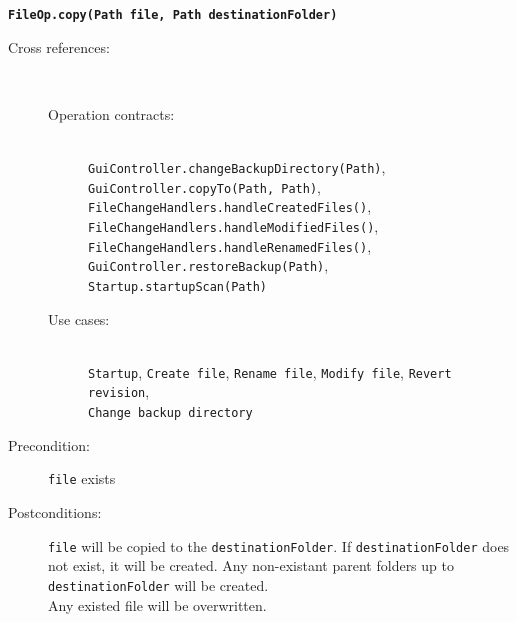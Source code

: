 \documentclass[12pt,a4paper]{article}
\begin{document}
\vspace{0.75cm}

\textbf{\texttt{FileOp.copy(Path file, Path destinationFolder)}}
\begin{description}
	\item[Cross references:] \hfill \vspace{-4ex}  \\
		\begin{description} 
		\item[Operation contracts:] \hfill \\
			\texttt{GuiController.changeBackupDirectory(Path)},\\
			\texttt{GuiController.copyTo(Path, Path)},\\
			\texttt{FileChangeHandlers.handleCreatedFiles()}, \\
			\texttt{FileChangeHandlers.handleModifiedFiles()}, \\
			\texttt{FileChangeHandlers.handleRenamedFiles()},\\
			\texttt{GuiController.restoreBackup(Path)},\\
			\texttt{Startup.startupScan(Path)}
		\item[Use cases:] \hfill \\
			\texttt{Startup}, \texttt{Create file}, \texttt{Rename file},
			\texttt{Modify file}, \texttt{Revert revision},\\
			\texttt{Change backup directory}
	\end{description} 	      
	\item[Precondition:] \texttt{file} exists
	\item[Postconditions:] \texttt{file} will be copied to the \texttt{destinationFolder}. If \texttt{destinationFolder} does not exist, it will be created. Any non-existant parent folders up to \texttt{destinationFolder} will be created.\\
	Any existed file will be overwritten.
\end{description}

\vspace{0.75cm}
\end{document}
